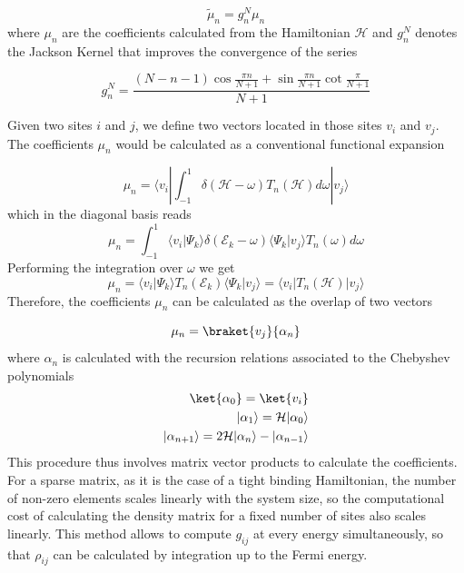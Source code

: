 \begin{equation}
\tilde \mu_n = g^N_n \mu_n
\end{equation}
where $\mu_n$ are the coefficients calculated from the Hamiltonian
$\mathcal{H}$ and $g_n^N$ denotes the Jackson Kernel that improves the
convergence of the series\cite{RevModPhys.78.275}

\begin{equation}
g_n^N =
\frac{(N-n-1)\cos \frac{\pi n}{N+1} + \sin \frac{\pi n}{N+1}
\cot \frac{\pi }{N+1}
}
{N+1}
\end{equation}

Given two sites $i$ and $j$, we define two vectors located in those sites
$v_i$ and $v_j$.
The coefficients $\mu_n$ would be calculated as a conventional functional
expansion

\begin{equation}
\mu_n = \langle v_i | \int_{-1}^{1}\delta (\mathcal{H}-\omega)T_n(\mathcal{H}) d \omega | v_j \rangle
\end{equation}
which in the diagonal basis reads
\begin{equation}
\mu_n = \int_{-1}^{1}\langle v_i | \Psi_k \rangle \delta (\mathcal{E}_k-\omega) \langle \Psi_k | v_j \rangle T_n(\omega) d \omega
\end{equation}
Performing the integration over $\omega$ we get
\begin{equation}
\mu_n = \langle v_i | \Psi_k \rangle T_n(\mathcal{E}_k)  \langle \Psi_k | v_j \rangle =
\langle v_i | T_n(\mathcal{H}) | v_j \rangle
\end{equation}
Therefore, the coefficients $\mu_n$ can be calculated as the overlap of two
vectors

\begin{equation}
\mu_n =
\braket{v_j}{\alpha_n}%
\end{equation}
where $\alpha_n$ is calculated with
the recursion relations associated to the Chebyshev polynomials
\begin{equation}
\begin{aligned}
\ket{\alpha_0} = \ket{v_i}  \\  %
|\alpha_1 \rangle = \mathcal{H} | \alpha_0 \rangle \\
|\alpha_{n+1} \rangle = 2\mathcal{H} | \alpha_n \rangle-
| \alpha_{n-1} \rangle
\end{aligned}
\end{equation}
This procedure thus involves matrix vector products to calculate the
coefficients. For a sparse matrix, as it is the case of a tight binding
Hamiltonian, the number of non-zero elements scales linearly with the system
size, so the computational cost of calculating the density matrix for a fixed
number of sites also scales linearly.
This method allows to compute $g_{ij}$ at every energy simultaneously, so
that $\rho_{ij}$ can be calculated by integration up to the Fermi energy.


